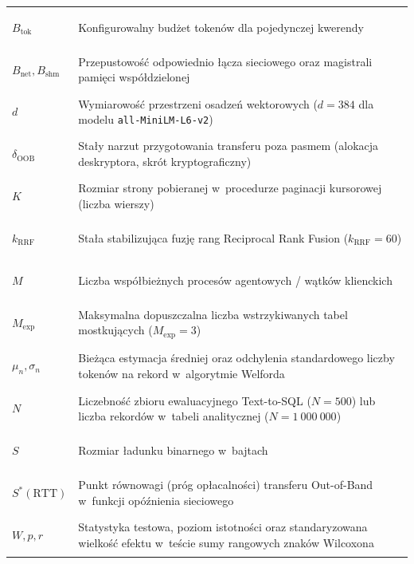 \begin{longtable}[l]{>{\bfseries\raggedright\arraybackslash}p{2.8cm} >{\raggedright\arraybackslash}p{12.0cm}}
$B_{\text{tok}}$ & Konfigurowalny budżet tokenów dla pojedynczej kwerendy \\[1.5pt]
$B_{\text{net}}, B_{\text{shm}}$ & Przepustowość odpowiednio łącza sieciowego oraz magistrali pamięci współdzielonej \\[1.5pt]
$d$ & Wymiarowość przestrzeni osadzeń wektorowych ($d = 384$ dla modelu \texttt{all-MiniLM-L6-v2}) \\[1.5pt]
$\delta_{\text{OOB}}$ & Stały narzut przygotowania transferu poza pasmem (alokacja deskryptora, skrót kryptograficzny) \\[1.5pt]
$K$ & Rozmiar strony pobieranej w~procedurze paginacji kursorowej (liczba wierszy) \\[1.5pt]
$k_{\text{RRF}}$ & Stała stabilizująca fuzję rang Reciprocal Rank Fusion ($k_{\text{RRF}} = 60$) \\[1.5pt]
$M$ & Liczba współbieżnych procesów agentowych / wątków klienckich \\[1.5pt]
$M_{\text{exp}}$ & Maksymalna dopuszczalna liczba wstrzykiwanych tabel mostkujących ($M_{\text{exp}} = 3$) \\[1.5pt]
$\mu_n, \sigma_n$ & Bieżąca estymacja średniej oraz odchylenia standardowego liczby tokenów na rekord w~algorytmie Welforda \\[1.5pt]
$N$ & Liczebność zbioru ewaluacyjnego Text-to-SQL ($N = 500$) lub liczba rekordów w~tabeli analitycznej ($N = 1\ 000\ 000$) \\[1.5pt]
$S$ & Rozmiar ładunku binarnego w~bajtach \\[1.5pt]
$S^*(\text{RTT})$ & Punkt równowagi (próg opłacalności) transferu Out-of-Band w~funkcji opóźnienia sieciowego \\[1.5pt]
$W, p, r$ & Statystyka testowa, poziom istotności oraz standaryzowana wielkość efektu w~teście sumy rangowych znaków Wilcoxona \\
\end{longtable}
